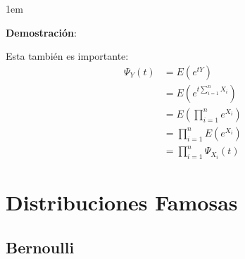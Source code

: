 \documentclass[12pt, fleqn]{report}                             %
\newenvironment{SmallIndentation}[1][0.75em]                    %
        {\begin{adjustwidth}{#1}{}\begin{footnotesize}}             %
        {\end{footnotesize}\end{adjustwidth}}                       %
\theoremstyle{break}                                            %
\newcommand{\Wrap}[1]           {\left( #1 \right)}             %
\begin{document}
\begin{itemize}
                        \begin{SmallIndentation}[1em]
                            \textbf{Demostración}:
                            
                            Esta también es importante:
                            \begin{align*}
                                \Psi_Y(t)
                                    &= E\Wrap{e^{tY}}                       \\
                                    &= E\Wrap{e^{t\sum_{i = 1}^n X_i}}      \\
                                    &= E\Wrap{\prod_{i = 1}^n e^{X_i}}      \\
                                    &= \prod_{i = 1}^n E\Wrap{e^{X_i}}      \\
                                    &= \prod_{i = 1}^n \Psi_{X_i}(t)
                            \end{align*}
                        
                        \end{SmallIndentation}


                \end{itemize}






    \chapter{Distribuciones Famosas}


        \clearpage
        \section{Bernoulli}


\end{document}
